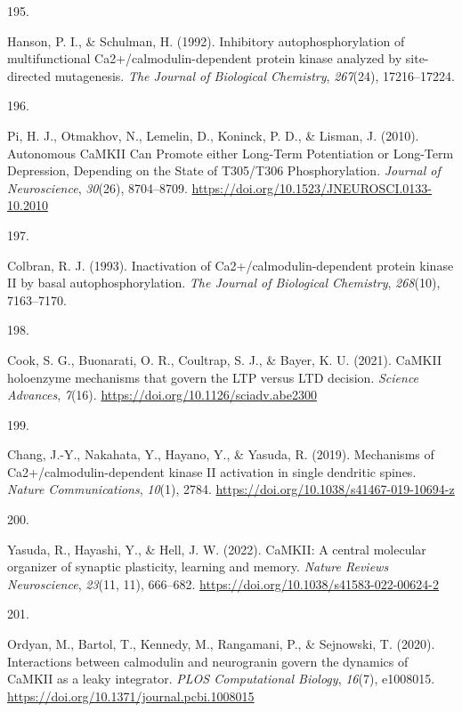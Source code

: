 \documentclass[
  11pt,
  letterpaper,
]{scrreprt}
\newlength{\cslhangindent}
\newlength{\csllabelwidth}
\newenvironment{CSLReferences}[2] %
 {\begin{list}{}{%
  \setlength{\itemindent}{0pt}
  \setlength{\leftmargin}{0pt}
  \setlength{\parsep}{0pt}
  \ifodd #1
   \setlength{\leftmargin}{\cslhangindent}
   \setlength{\itemindent}{-1\cslhangindent}
  \fi
  \setlength{\itemsep}{#2\baselineskip}}}
 {\end{list}}
\newcommand{\CSLLeftMargin}[1]{\parbox[t]{\csllabelwidth}{\strut#1\strut}}
\newcommand{\CSLRightInline}[1]{\parbox[t]{\linewidth - \csllabelwidth}{\strut#1\strut}}
\begin{document}
\begin{CSLReferences}{0}{0}
\CSLLeftMargin{195. }%
\CSLRightInline{Hanson, P. I., \& Schulman, H. (1992). Inhibitory
autophosphorylation of multifunctional {Ca2}+/calmodulin-dependent
protein kinase analyzed by site-directed mutagenesis. \emph{The Journal
of Biological Chemistry}, \emph{267}(24), 17216--17224.}

\CSLLeftMargin{196. }%
\CSLRightInline{Pi, H. J., Otmakhov, N., Lemelin, D., Koninck, P. D., \&
Lisman, J. (2010). Autonomous {CaMKII Can Promote} either {Long-Term
Potentiation} or {Long-Term Depression}, {Depending} on the {State} of
{T305}/{T306 Phosphorylation}. \emph{Journal of Neuroscience},
\emph{30}(26), 8704--8709.
\url{https://doi.org/10.1523/JNEUROSCI.0133-10.2010}}

\CSLLeftMargin{197. }%
\CSLRightInline{Colbran, R. J. (1993). Inactivation of
{Ca2}+/calmodulin-dependent protein kinase {II} by basal
autophosphorylation. \emph{The Journal of Biological Chemistry},
\emph{268}(10), 7163--7170.}

\CSLLeftMargin{198. }%
\CSLRightInline{Cook, S. G., Buonarati, O. R., Coultrap, S. J., \&
Bayer, K. U. (2021). {CaMKII} holoenzyme mechanisms that govern the
{LTP} versus {LTD} decision. \emph{Science Advances}, \emph{7}(16).
\url{https://doi.org/10.1126/sciadv.abe2300}}

\CSLLeftMargin{199. }%
\CSLRightInline{Chang, J.-Y., Nakahata, Y., Hayano, Y., \& Yasuda, R.
(2019). Mechanisms of {Ca2}+/calmodulin-dependent kinase {II} activation
in single dendritic spines. \emph{Nature Communications}, \emph{10}(1),
2784. \url{https://doi.org/10.1038/s41467-019-10694-z}}

\CSLLeftMargin{200. }%
\CSLRightInline{Yasuda, R., Hayashi, Y., \& Hell, J. W. (2022).
{CaMKII}: A central molecular organizer of synaptic plasticity, learning
and memory. \emph{Nature Reviews Neuroscience}, \emph{23}(11, 11),
666--682. \url{https://doi.org/10.1038/s41583-022-00624-2}}

\CSLLeftMargin{201. }%
\CSLRightInline{Ordyan, M., Bartol, T., Kennedy, M., Rangamani, P., \&
Sejnowski, T. (2020). Interactions between calmodulin and neurogranin
govern the dynamics of {CaMKII} as a leaky integrator. \emph{PLOS
Computational Biology}, \emph{16}(7), e1008015.
\url{https://doi.org/10.1371/journal.pcbi.1008015}}


\end{CSLReferences}
\end{document}

